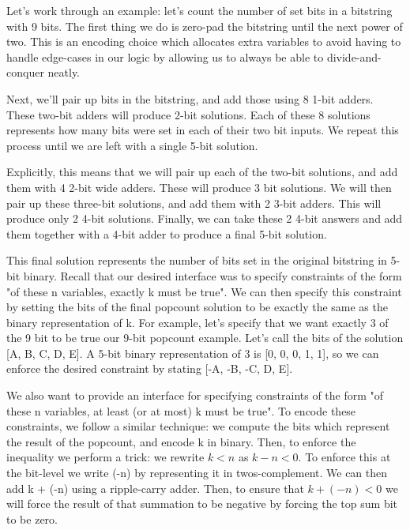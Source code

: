 Let's work through an example: let's count the number of set bits in a bitstring with 9 bits. The first thing we do is zero-pad the bitstring until the next power of two. This is an encoding choice which allocates extra variables to avoid having to handle edge-cases in our logic by allowing us to always be able to divide-and-conquer neatly.

Next, we'll pair up bits in the bitstring, and add those using 8 1-bit adders. These two-bit adders will produce 2-bit solutions. Each of these 8 solutions represents how many bits were set in each of their two bit inputs. We repeat this process until we are left with a single 5-bit solution.

Explicitly, this means that we will pair up each of the two-bit solutions, and add them with 4 2-bit wide adders. These will produce 3 bit solutions. We will then pair up these three-bit solutions, and add them with 2 3-bit adders. This will produce only 2 4-bit solutions. Finally, we can take these 2 4-bit answers and add them together with a 4-bit adder to produce a final 5-bit solution.

This final solution represents the number of bits set in the original bitstring in 5-bit binary. Recall that our desired interface was to specify constraints of the form "of these n variables, exactly k must be true". We can then specify this constraint by setting the bits of the final popcount solution to be exactly the same as the binary representation of k. For example, let's specify that we want exactly 3 of the 9 bit to be true our 9-bit popcount example. Let's call the bits of the solution [A, B, C, D, E]. A 5-bit binary representation of 3 is [0, 0, 0, 1, 1], so we can enforce the desired constraint by stating [-A, -B, -C, D, E].

We also want to provide an interface for specifying constraints of the form "of these n variables, at least (or at most) k must be true". To encode these constraints, we follow a similar technique: we compute the bits which represent the result of the popcount, and encode k in binary. Then, to enforce the inequality we perform a trick: we rewrite $ k < n $ as $ k - n < 0$. To enforce this at the bit-level we write (-n) by representing it in twos-complement. We can then add k + (-n) using a ripple-carry adder. Then, to ensure that $k + (-n) < 0$ we will force the result of that summation to be negative by forcing the top sum bit to be zero.
